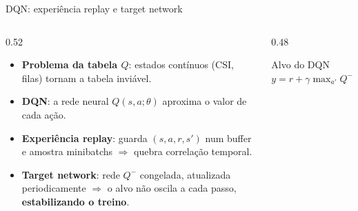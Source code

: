 \documentclass[aspectratio=169,11pt]{beamer}
\begin{document}
\begin{frame}{DQN: experiência replay e target network}
  \begin{columns}
    \begin{column}{0.52\textwidth}
      \begin{itemize}
        \item \textbf{Problema da tabela $Q$}: estados contínuos (CSI, filas) tornam a tabela inviável.
        \item \textbf{DQN}: a rede neural $Q(s,a;\theta)$ aproxima o valor de cada ação.
        \item \textbf{Experiência replay}: guarda $(s,a,r,s')$ num buffer e amostra minibatchs $\Rightarrow$ quebra correlação temporal.
        \item \textbf{Target network}: rede $Q^-$ congelada, atualizada periodicamente $\Rightarrow$ o alvo não oscila a cada passo, \textbf{estabilizando o treino}.
      \end{itemize}
    \end{column}
    \begin{column}{0.48\textwidth}
      \begin{center}
      \end{center}
      \begin{alertblock}{Alvo do DQN}
        $y = r + \gamma \max_{a'} Q^-(s',a')$
      \end{alertblock}
    \end{column}
  \end{columns}
\end{frame}
\end{document}
